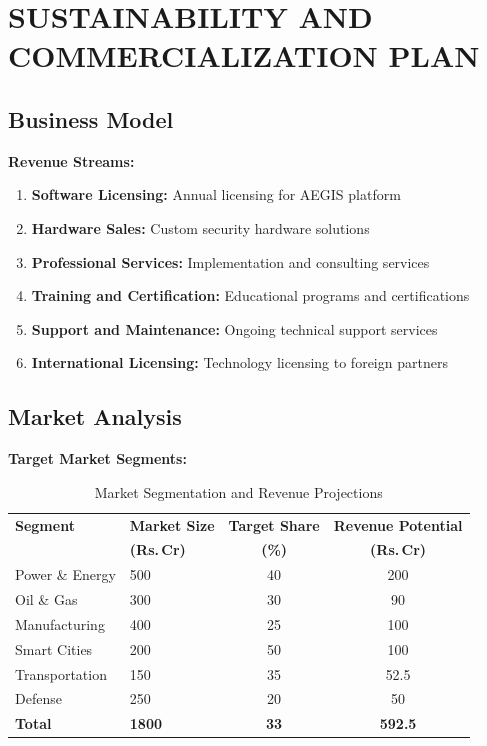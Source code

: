 \documentclass[12pt,a4paper]{article}
\newcommand{\rupees}{Rs.\,}
\begin{document}
\newpage

\section{SUSTAINABILITY AND COMMERCIALIZATION PLAN}

\subsection{Business Model}

\textbf{Revenue Streams:}
\begin{enumerate}
    \item \textbf{Software Licensing:} Annual licensing for AEGIS platform
    \item \textbf{Hardware Sales:} Custom security hardware solutions
    \item \textbf{Professional Services:} Implementation and consulting services
    \item \textbf{Training and Certification:} Educational programs and certifications
    \item \textbf{Support and Maintenance:} Ongoing technical support services
    \item \textbf{International Licensing:} Technology licensing to foreign partners
\end{enumerate}

\subsection{Market Analysis}

\textbf{Target Market Segments:}
\begin{table}[H]
\centering
\begin{tabular}{|p{3cm}|p{3cm}|c|c|}
\hline
\rowcolor{lightblue}
\textbf{Segment} & \textbf{Market Size} & \textbf{Target Share} & \textbf{Revenue Potential} \\
& \textbf{(\rupees Cr)} & \textbf{(\%)} & \textbf{(\rupees Cr)} \\
\hline

Power \& Energy & 500 & 40 & 200 \\
\hline

Oil \& Gas & 300 & 30 & 90 \\
\hline

Manufacturing & 400 & 25 & 100 \\
\hline

Smart Cities & 200 & 50 & 100 \\
\hline

Transportation & 150 & 35 & 52.5 \\
\hline

Defense & 250 & 20 & 50 \\
\hline

\rowcolor{yellow}
\textbf{Total} & \textbf{1800} & \textbf{33} & \textbf{592.5} \\
\hline

\end{tabular}
\caption{Market Segmentation and Revenue Projections}
\end{table}
\end{document}
